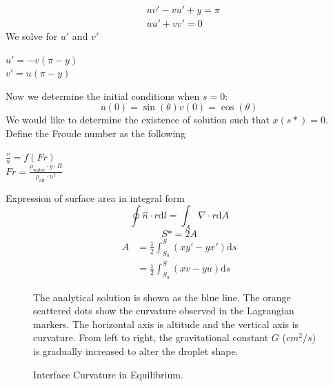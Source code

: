 \documentclass{jfm}
\begin{document}
        \begin{equation}
        \begin{aligned}
        &uv'-vu'+y=\pi \\
        &uu'+vv'=0
        \end{aligned}
        \end{equation}
        We solve for $u'$ and $v'$\\
        \begin{center}
        $u'=-v(\pi-y)$\\
        $v'=u(\pi-y)$
        \end{center}
        Now we determine the initial conditions when $s=0$:\\
        \begin{equation}
        u(0)=\sin(\theta)
        v(0)=\cos(\theta)
        \end{equation}
        We would like to determine the existence of solution such that $x(s*)=0$.\\
        Define the Froude number as the following\\
        \begin{center}
        $\frac{v}{u}=f(Fr)$\\
        $Fr=\frac{\rho_{\text{water}}\cdot{g}\cdot{R}}{\rho_{\text{air}}\cdot{u^2}}$
        \end{center}
        Expression of surface area in integral form\\
        \begin{equation}
        \oint\hat{n}\cdot{r}\mathrm{d}l=\int_{A}\nabla\cdot{r}\mathrm{d}A
        \end{equation}
        \begin{equation}
        S*=2A
        \end{equation}
        \begin{equation}
        \begin{aligned}
        A&=\frac{1}{2}\int_{S_0}^{S}(xy'-yx')\mathrm{d}s\\
        &=\frac{1}{2}\int_{S_0}^{S}(xv-yu)\mathrm{d}s
        \end{aligned}
        \end{equation}
        
        \begin{figure} \label{fig:h-curvature}
        \caption{Interface Curvature in Equilibrium.} 
        \small 
        The analytical solution is shown as the blue line. The orange scattered dots show the curvature observed in the Lagrangian markers. The horizontal axis is altitude and the vertical axis is curvature. From left to right, the gravitational constant $G$ ($cm^2/s$) is gradually increased to alter the droplet shape.
        \end{figure}
\end{document}
